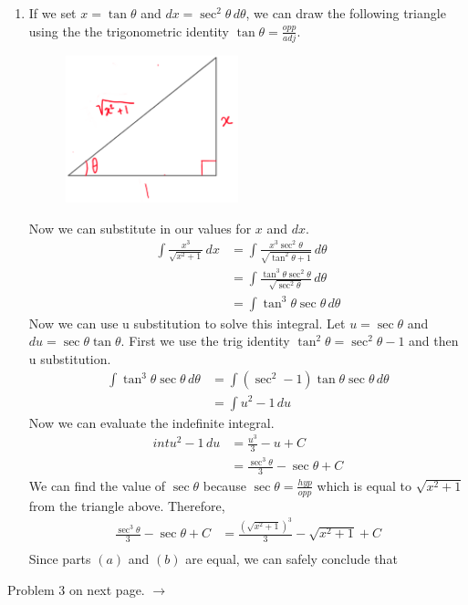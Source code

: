 \documentclass{article}
\begin{document}
\begin{enumerate}[label=\textbf{(5.\arabic*)}]
\begin{enumerate}
    \item If we set $x=\tan\theta$ and $dx=\sec^2\theta\,d\theta$, we can draw the following triangle using the the trigonometric identity $\tan\theta=\frac{opp}{adj}$. 
    \begin{figure}[H]
        \centering
        \includegraphics[width=5cm]{blurp}
    \end{figure}
    Now we can substitute in our values for $x$ and $dx$.
    \begin{align*}
        \int\!\frac{x^3}{\sqrt{x^2+1}}\,dx &= \int\!\frac{x^3\sec^2\theta}{\sqrt{\tan^2\theta+1}}\,d\theta \\
        &= \int\!\frac{\tan^3\theta\sec^2\theta}{\sqrt{\sec^2\theta}}\,d\theta \\
        &=\int\!\tan^3\theta\sec\theta\,d\theta
    \end{align*}
    Now we can use u substitution to solve this integral. Let $u=\sec\theta$ and $du=\sec\theta\tan\theta$. First we use the trig identity $\tan^2\theta=\sec^2\theta-1$ and then u substitution.
    \begin{align*}
        \int\!\tan^3\theta\sec\theta\,d\theta &= \int\!\left(\sec^2-1\right)\tan\theta\sec\theta\,d\theta \\
        &= \int\!u^2-1\,du
    \end{align*}
    Now we can evaluate the indefinite integral.
    \begin{align*}
        int\!u^2-1\,du &= \frac{u^3}{3}-u+C \\
        &= \frac{\sec^3\theta}{3}-\sec\theta+C
    \end{align*}
    We can find the value of $\sec\theta$ because $\sec\theta=\frac{hyp}{opp}$ which is equal to $\sqrt{x^2+1}$ from the triangle above. Therefore,
    \begin{align*}
        \frac{\sec^3\theta}{3}-\sec\theta+C &= \frac{{\left(\sqrt{x^2+1}\right)}^3}{3}-\sqrt{x^2+1}+C \\
    \end{align*}
    Since parts $(a)$ and $(b)$ are equal, we can safely conclude that
    \begin{center}
    \end{center}
\end{enumerate}
\vspace{1 in}
\begin{center}
Problem 3 on next page. $\rightarrow$
\end{center}


\end{enumerate}
\end{document}
